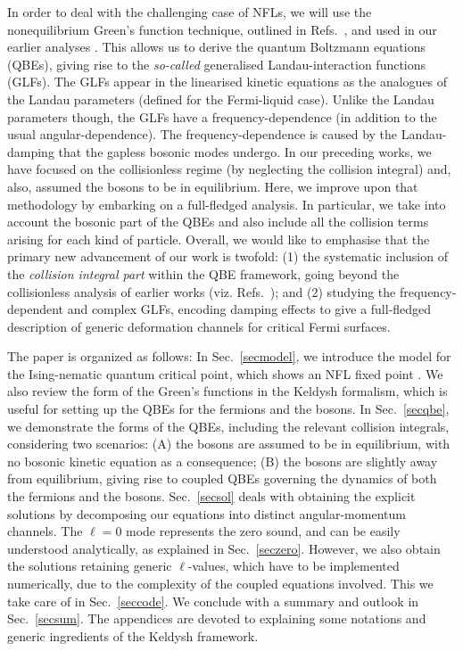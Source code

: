 \documentclass[aps, prb, onecolumn, nofootinbib, citeautoscript, 10pt]{revtex4-2}
\begin{document}
In order to deal with the challenging case of NFLs, we will use the nonequilibrium Green's function technique, outlined in Refs.~\cite{prange, kim_qbe}, and used in our earlier analyses \cite{ips-zero-mode, ips-kazi}. This allows us to derive the quantum Boltzmann equations (QBEs), giving rise to the \textit{so-called} generalised Landau-interaction functions (GLFs). The GLFs appear in the linearised kinetic equations as the analogues of the Landau parameters (defined for the Fermi-liquid case). Unlike the Landau parameters though, the GLFs have a frequency-dependence (in addition to the usual angular-dependence). The frequency-dependence is caused by the Landau-damping that the gapless bosonic modes undergo. In our preceding works, we have focused on the collisionless regime (by neglecting the collision integral) and, also, assumed the bosons to be in equilibrium. Here, we improve upon that methodology by embarking on a full-fledged analysis. In particular, we take into account the bosonic part of the QBEs and also include all the collision terms arising for each kind of particle. Overall, we would like to emphasise that the primary new advancement of our work is twofold: (1) the systematic inclusion of the \textit{collision integral part} within the QBE framework, going beyond the collisionless analysis of earlier works (viz. Refs.~\cite{ips-zero-mode, ips-kazi}); and (2) studying the frequency-dependent and complex GLFs, encoding damping effects to give a full-fledged description of generic deformation channels for critical Fermi surfaces.


The paper is organized as follows: In Sec.~\ref{secmodel}, we introduce the model for the Ising-nematic quantum critical point, which shows an NFL fixed point \cite{Lee-Dalid, ips-uv-ir1, ips-uv-ir2, ips-subir,ips-sc, ips-zero-mode, ips-kazi}. We also review the form of the Green's functions in the Keldysh formalism, which is useful for setting up the QBEs for the fermions and the bosons. In Sec.~\ref{secqbe}, we demonstrate the forms of the QBEs, including the relevant collision integrals, considering two scenarios: (A) the bosons are assumed to be in equilibrium, with no bosonic kinetic equation as a consequence; (B) the bosons are slightly away from equilibrium, giving rise to coupled QBEs governing the dynamics of both the fermions and the bosons. Sec.~\ref{secsol} deals with obtaining the explicit solutions by decomposing our equations into distinct angular-momentum channels. The $\ell = 0$ mode represents the zero sound, and can be easily understood analytically, as explained in Sec.~\ref{seczero}. However, we also obtain the solutions retaining generic $ \ell$-values, which have to be implemented numerically, due to the complexity of the coupled equations involved. This we take care of in Sec.~\ref{seccode}. We conclude with a summary and outlook in Sec.~\ref{secsum}. The appendices are devoted to explaining some notations and generic ingredients of the Keldysh framework.
\end{document}
